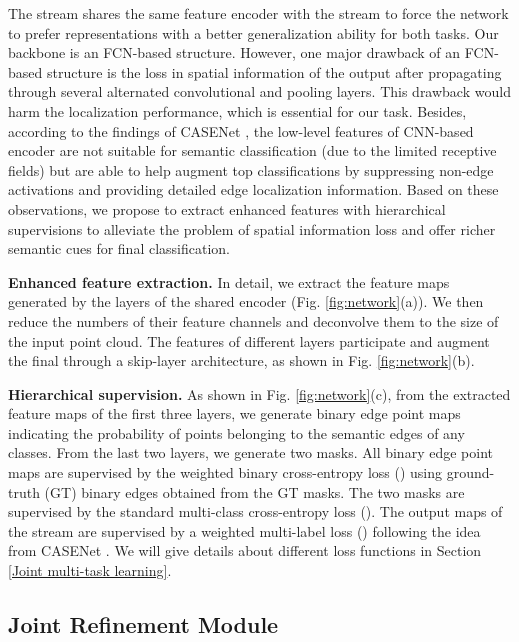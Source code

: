 \documentclass[runningheads]{llncs}
\begin{document}
The {{\SemEdgeD}} stream shares the same feature encoder with the {{\SemSeg}} stream to force the network to prefer representations with {a} better generalization ability for both tasks. Our backbone is an FCN-based structure. However, one {major} 
drawback of {an} FCN-based structure is the loss in spatial information of the output after propagating through several alternated convolutional and pooling layers. {This drawback would} harm the localization performance, which is essential for our {\SemEdgeD} task. Besides, according to the findings of CASENet \cite{yu2017casenet}, the {low}{-}level
features of CNN-based encoder are not suitable for semantic classification (due to the limited receptive fields) but {are able to} help augment top classifications by suppressing non-edge activations and providing detailed edge localization information. Based on these observations, we propose to extract enhanced features with hierarchical supervisions 
to alleviate the problem of spatial information loss and offer richer semantic cues for final classification.

{
\smallskip \noindent \textbf{Enhanced feature extraction.}
In detail, we extract the feature maps generated by the layers of the shared encoder (Fig. \ref{fig:network}(a)). We then reduce the numbers of their feature channels and deconvolve them to the size of the input point cloud. The features of different layers participate and augment the final {\SemEdgeD} through a skip-layer architecture, as shown in Fig. \ref{fig:network}(b).

\smallskip \noindent \textbf{Hierarchical supervision.}
As shown in Fig. \ref{fig:network}(c), from the extracted feature maps of the first three layers, we generate binary edge point maps indicating the probability of points belonging to the semantic edges of any classes. From the last two layers, we generate two {\SemSegPoint} masks. 
All binary edge point maps are supervised by the weighted binary cross-entropy loss () using ground-truth (GT) binary edges obtained from {the} GT {\SemSegPoint} masks. The two {\SemSegPoint} masks are supervised by the standard multi-class cross-entropy loss (). The output {\SemEdgePoint} maps of the {{\SemEdgeD}} stream are supervised by a weighted multi-label loss () following the idea from CASENet \cite{yu2017casenet}. We will give details about different loss functions in Section \ref{Joint multi-task learning}.
} 
\subsection{Joint Refinement Module} \label{Joint refinement module}
\end{document}
